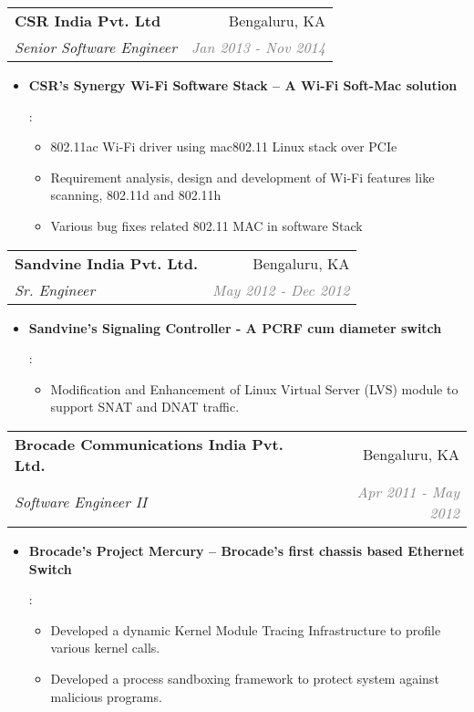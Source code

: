 \documentclass[letterpaper,11pt]{article}
\makeatletter
\newcommand{\resumeItem}[2]{
  \item\small{
    \textbf{#1}{: #2 \vspace{-2pt}}
  }
}
\newcommand{\resumeSubheading}[4]{
  \vspace{-1pt}\item
    \begin{tabular*}{0.97\textwidth}[t]{l@{\extracolsep{\fill}}r}
      \textbf{#1} & #2 \\
      \textit{\small#3} & \textit{\small #4} \\
    \end{tabular*}\vspace{-5pt}
}
\newcommand{\resumeItemListStart}{\begin{itemize}}
\newcommand{\resumeItemListEnd}{\end{itemize}\vspace{-5pt}}
\makeatother
\begin{document}
    \resumeSubheading
      {CSR India Pvt. Ltd}{\textcolor{RED1}{Bengaluru, KA}}
      {Senior Software Engineer}{\textcolor{GRAY}{Jan 2013 - Nov 2014}}
      \resumeItemListStart
        \resumeItem{CSR’s Synergy Wi-Fi Software Stack – A Wi-Fi Soft-Mac solution}
          {
	          \begin{itemize}
    		      \item {802.11ac Wi-Fi driver using mac802.11 Linux stack over PCIe}
    	    		  \item {Requirement analysis, design and development of Wi-Fi features like scanning, 802.11d and 802.11h}
          	 \item {Various bug fixes related 802.11 MAC in software Stack}          
          	\end{itemize}  
          }
      \resumeItemListEnd

    \resumeSubheading
      {Sandvine India Pvt. Ltd.}{\textcolor{RED1}{Bengaluru, KA}}
      {Sr. Engineer}{\textcolor{GRAY}{May 2012 - Dec 2012}}
      \resumeItemListStart
        \resumeItem{Sandvine’s Signaling Controller - A PCRF cum diameter switch}
          {
          \begin{itemize}
          \item {Modification and Enhancement of Linux Virtual Server (LVS) module to support SNAT and DNAT traffic.}
          \end{itemize}
          }
      \resumeItemListEnd

    \resumeSubheading
      {Brocade Communications India Pvt. Ltd.}{\textcolor{RED1}{Bengaluru, KA}}
      {Software Engineer II}{\textcolor{GRAY}{Apr 2011 - May 2012}}
      \resumeItemListStart
        \resumeItem{Brocade’s Project Mercury – Brocade’s first chassis based Ethernet Switch}
      {
         \begin{itemize}
          \item Developed a dynamic Kernel Module Tracing Infrastructure to profile various kernel calls.
          \item Developed a process sandboxing framework to protect system against malicious programs.
		\end{itemize}
	}
		  \resumeItemListEnd
		
\end{document}
